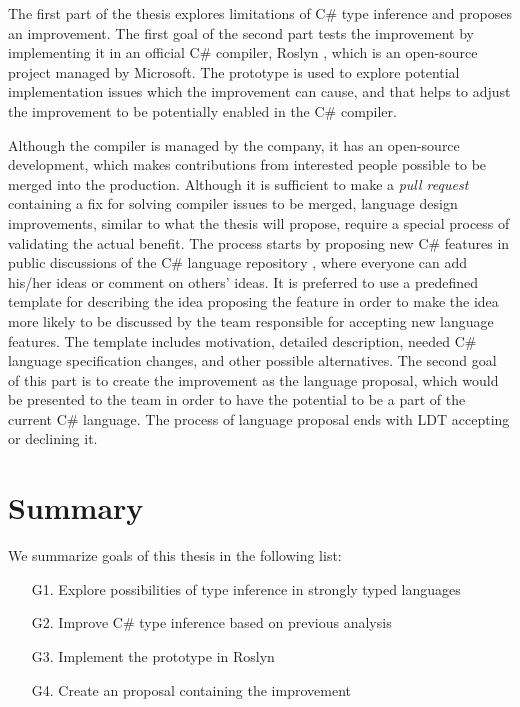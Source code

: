 The first part of the thesis explores limitations of C\# type inference and proposes an improvement.
The first goal of the second part tests the improvement by implementing it in an official C\# compiler, Roslyn \cite{online:roslynRepo}, which is an open-source project managed by Microsoft.
The prototype is used to explore potential implementation issues which the improvement can cause, and that helps to adjust the improvement to be potentially enabled in the C\# compiler.
\par
Although the compiler is managed by the company, it has an open-source development, which makes contributions from interested people possible to be merged into the production.
Although it is sufficient to make a \textit{pull request} containing a fix for solving compiler issues to be merged, language design improvements, similar to what the thesis will propose, require a special process of validating the actual benefit.
The process starts by proposing new C\# features in public discussions of the C\# language repository \cite{online:langRepo}, where everyone can add his/her ideas or comment on others' ideas. 
It is preferred to use a predefined template \cite{online:proposalTemplate} for describing the idea proposing the feature in order to make the idea more likely to be discussed by the team responsible for accepting new language features. 
The template includes motivation, detailed description, needed C\# language specification \cite{online:langSpec} changes, and other possible alternatives.
The second goal of this part is to create the improvement as the language proposal, which would be presented to the team in order to have the potential to be a part of the current C\# language.
The process of language proposal ends with \ac{LDT} accepting or declining it. 

\section{Summary}

We summarize goals of this thesis in the following list:

\begin{enumerate}
  \item[G1.] Explore possibilities of type inference in strongly typed languages
  \item[G2.] Improve C\# type inference based on previous analysis
  \item[G3.] Implement the prototype in Roslyn
  \item[G4.] Create an proposal containing the improvement
\end{enumerate}